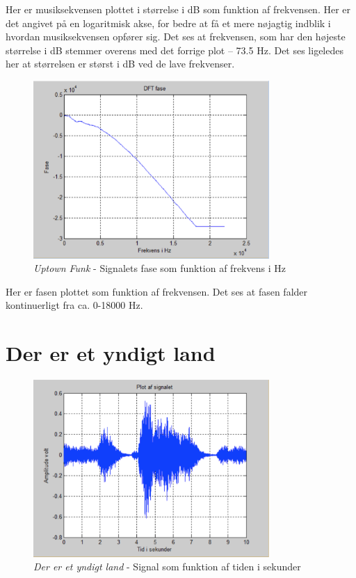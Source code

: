 Her er musiksekvensen plottet i størrelse i dB som funktion af frekvensen. Her er det angivet på en logaritmisk akse, for bedre at få et mere nøjagtig indblik i hvordan musiksekvensen opfører sig. Det ses at frekvensen, som har den højeste størrelse i dB stemmer overens med det forrige plot – 73.5 Hz. Det ses ligeledes her at størrelsen er størst i dB ved de lave frekvenser.

\begin{figure}[H]
	\centering
	\includegraphics[width=0.8\textwidth]{Figurer/UptownFunk4}
	\caption{\textit{Uptown Funk} - Signalets fase som funktion af frekvens i Hz}
\end{figure}

Her er fasen plottet som funktion af frekvensen. Det ses at fasen falder kontinuerligt fra ca. 0-18000 Hz.

\section{Der er et yndigt land}

\begin{figure}[H]
	\centering
	\includegraphics[width=0.8\textwidth]{Figurer/Nationalsang}
	\caption{\textit{Der er et yndigt land} - Signal som funktion af tiden i sekunder}
\end{figure}

